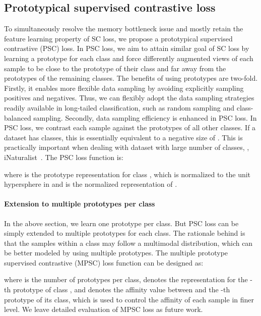 \documentclass[final]{cvpr}
\begin{document}
\subsection{Prototypical supervised contrastive loss}
\label{sec:psc}
To simultaneously resolve the memory bottleneck issue and mostly retain the feature learning property of SC loss, we propose a prototypical supervised contrastive (PSC) loss. 
In PSC loss, we aim to attain similar goal of SC loss by learning a prototype for each class and force differently augmented views of each sample to be close to the prototype of their class and far away from the prototypes of the remaining classes. The benefits of using prototypes are two-fold. Firstly, it enables more flexible data sampling by avoiding explicitly sampling positives and negatives. Thus, we can flexibly adopt the data sampling strategies readily available in long-tailed classification, such as random sampling and class-balanced sampling. Secondly, data sampling efficiency is enhanced in PSC loss. In PSC loss, we contrast each sample against the prototypes of all other classes. If a dataset has  classes, this is essentially equivalent to a negative size of . This is practically important when dealing with dataset with large number of classes, \eg, iNaturalist~\cite{inat2017}. The PSC loss function is:
 
where  is the prototype representation for class , which is normalized to the unit hypersphere in  and  is the normalized representation of .


\paragraph{Extension to multiple prototypes per class}{}

In the above section, we learn one prototype per class. But PSC loss can be simply extended to multiple prototypes for each class. The rationale behind is that the samples within a class may follow a multimodal distribution, which can be better modeled by using multiple prototypes. The multiple prototype supervised contrastive (MPSC) loss function can be designed as:


where  is the number of prototypes per class,  denotes the representation for the -th prototype of class , and  denotes the affinity value between  and the -th prototype of its class, which is used to control the affinity of each sample in finer level. 
We leave detailed evaluation of MPSC loss as future work.
\end{document}
